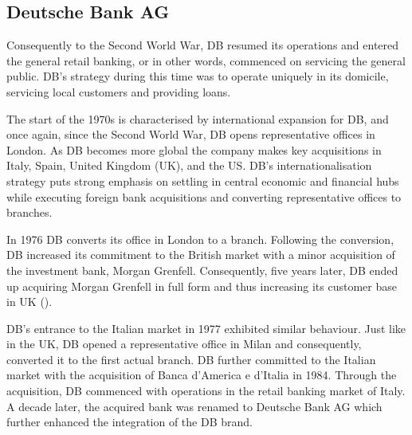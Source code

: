 \documentclass[11pt,a4paper]{article}
\begin{document}
{{\subsection{Deutsche Bank AG}
\vspace{-1mm}
 \par
Consequently to the Second World War, DB resumed its operations and entered the general retail banking, or in other words, commenced on servicing the general public. DB's strategy during this time was to operate uniquely in its domicile, servicing local customers and providing loans.  \par
The start of the 1970s  is characterised by international expansion for DB, and once again, since the Second World War, DB opens representative offices in London. As DB becomes more global the company makes key acquisitions in Italy, Spain, United Kingdom (UK), and the US. DB's internationalisation strategy puts strong emphasis on settling in central economic and financial hubs while executing foreign bank acquisitions and converting representative offices to branches. \par
In 1976 DB converts its office in London to a branch. Following the conversion, DB increased its commitment to the British market with a minor acquisition of the investment bank, Morgan Grenfell. Consequently, five years later, DB ended up acquiring Morgan Grenfell in full form and thus increasing its customer base in UK (\cite{deutschebankagDeutscheBankUnited}). \par %
DB's entrance to the Italian market in 1977 exhibited similar behaviour. Just like in the UK, DB opened a representative office in Milan and consequently, converted it to the first actual branch. DB further committed to the Italian market with the acquisition of Banca d'America e d'Italia in 1984. Through the acquisition, DB commenced with operations in the retail banking market of Italy. A decade later, the acquired bank was renamed to Deutsche Bank AG which further enhanced the integration of the DB brand. %
}}
\end{document}
